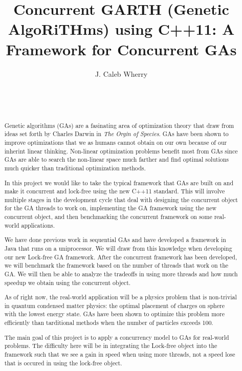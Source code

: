 \documentclass{acm_proc_article-sp}
\begin{document}
\title{
Concurrent GARTH (Genetic AlgoRiTHms) using C++11: A Framework for Concurrent GAs
}


\author{
\alignauthor
J. Caleb Wherry \\
   \\
   \\
   \\
}

\maketitle


%
%
\begin{abstract}
Genetic algorithms (GAs) are a fasinating area of optimization theory that draw from ideas set forth by Charles Darwin in \emph{The Orgin of Species}. GAs have been shown to improve optimizations that we as humans cannot obtain on our own because of our inherint linear thinking. Non-linear optimization problems benefit most from GAs since GAs are able to search the non-linear space much farther and find optimal solutions much quicker than traditional optimization methods.

In this project we would like to take the typical framework that GAs are built on and make it concurrent and lock-free using the new C++11 standard. This will involve multiple stages in the development cycle that deal with designing the concurrent object for the GA threads to work on, implementing the GA framework using the new concurrent object, and then benchmarking the concurrent framework on some real-world applications.

We have done previous work in sequential GAs and have developed a framework in Java that runs on a uniprocessor. We will draw from this knowledge when developing our new Lock-free GA framework. After the concurrent framework has been developed, we will benchmark the framework based on the number of threads that work on the GA. We will then be able to analyze the tradeoffs in using more threads and how much speedup we obtain using the concurrent object.

As of right now, the real-world application will be a physics problem that is non-trivial in quantum condensed matter physics: the optimal placement of charges on sphere with the lowest energy state\cite{pang:compphys}. GAs have been shown to optimize this problem more efficiently than tarditional methods when the number of particles exceeds 100.

The main goal of this project is to apply a concurrency model to GAs for real-world problems. The difficulty here will be in integrating the Lock-free object into the framework such that we see a gain in speed when using more threads, not a speed lose that is occured in using the lock-free object.
\end{abstract}
\end{document}

